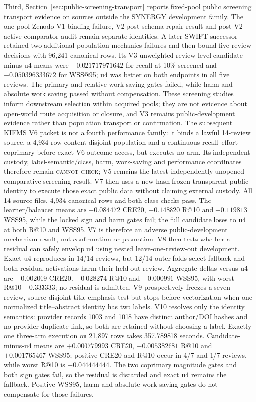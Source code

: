 Third, Section~\ref{sec:public-screening-transport} reports fixed-pool public
screening transport evidence on sources outside the SYNERGY development
family.  The one-pool Zenodo V1 binding failure, V2 post-schema-repair result
and post-V2 active-comparator audit remain separate identities.  A later SWIFT
successor retained two additional population-mechanics failures and then bound
five review decisions with 96,241 canonical rows.  Its V3 unweighted
review-level candidate-minus-u4 means were $-0.021717971642$ for recall at 10\%
screened and $-0.050396333672$ for WSS@95; u4 was better on both endpoints in
all five reviews.  The primary and relative-work-saving gates failed, while
harm and absolute work saving passed without compensation.  These screening
studies inform downstream selection within acquired pools; they are not
evidence about open-world route acquisition or closure, and V3 remains
public-development evidence rather than population transport or confirmation.
The subsequent KIFMS V6 packet is not a fourth performance family: it binds a
lawful 14-review source, a 4,934-row content-disjoint population and a
continuous recall--effort coprimary before exact V6 outcome access, but executes
no arm.  Its independent custody, label-semantic/class, harm, work-saving and
performance coordinates therefore remain \textsc{cannot-check}; V5 remains the
latest independently unopened comparative screening result. V7 then uses a new
hash-frozen transparent-public identity to execute those exact public data
without claiming external custody. All 14 source files, 4,934 canonical rows
and both-class checks pass. The learner/balancer means are $+0.084472$ CRE20,
$+0.148820$ R@10 and $+0.119813$ WSS95, while the locked sign and harm gates
fail; the full candidate loses to u4 at both R@10 and WSS95. V7 is therefore an
adverse public-development mechanism result, not confirmation or promotion.
V8 then tests whether a residual can safely envelop u4 using nested
leave-one-review-out development. Exact u4 reproduces in 14/14 reviews, but
12/14 outer folds select fallback and both residual activations harm their held
out review. Aggregate deltas versus u4 are $-0.002009$ CRE20, $-0.028274$ R@10
and $-0.000991$ WSS95, with worst R@10 $-0.333333$; no residual is admitted.
V9 prospectively freezes a seven-review, source-disjoint title-emphasis test but
stops before vectorization when one normalized title--abstract identity has two
labels. V10 resolves only the identity semantics: provider records 1003 and
1018 have distinct author/DOI hashes and no provider duplicate link, so both
are retained without choosing a label. Exactly one three-arm execution on
21,897 rows takes 357.789818 seconds. Candidate-minus-u4 means are
$+0.000779993$ CRE20, $-0.005382681$ R@10 and $+0.001765467$ WSS95; positive
CRE20 and R@10 occur in 4/7 and 1/7 reviews, while worst R@10 is
$-0.044444444$. The two coprimary magnitude gates and both sign gates fail, so
the residual is discarded and exact u4 remains the fallback. Positive WSS95,
harm and absolute-work-saving gates do not compensate for those failures.

